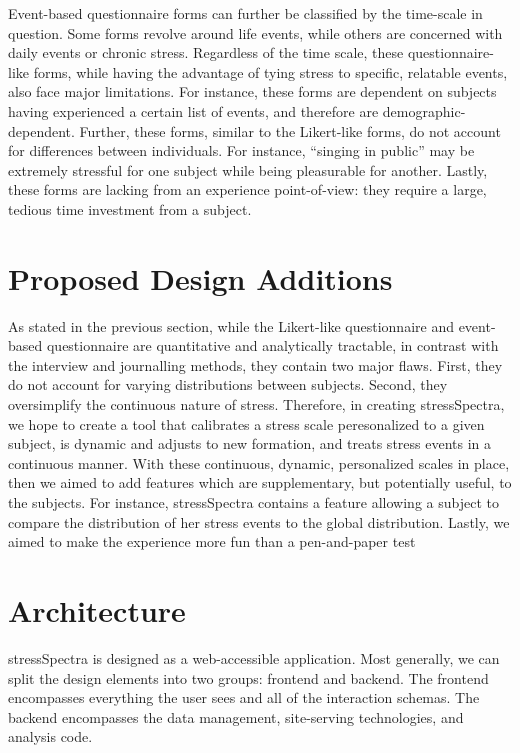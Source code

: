 \documentclass{sigchi}
\begin{document}
Event-based questionnaire forms can further be classified by the time-scale in question. Some forms revolve around life events, while others are concerned with daily events or chronic stress. Regardless of the time scale, these questionnaire-like forms, while having the advantage of tying stress to specific, relatable events, also face major limitations. For instance, these forms are dependent on subjects having experienced a certain list of events, and therefore are demographic-dependent. Further, these forms, similar to the Likert-like forms, do not account for differences between individuals. For instance, “singing in public” may be extremely stressful for one subject while being pleasurable for another. Lastly, these forms are lacking from an experience point-of-view: they require a large, tedious time investment from a subject.


\section{Proposed Design Additions}
As stated in the previous section, while the Likert-like questionnaire and event-based questionnaire are quantitative and analytically tractable, in contrast with the interview and journalling methods, they contain two major flaws. First, they do not account for varying distributions between subjects. Second, they oversimplify the continuous nature of stress.
Therefore, in creating stressSpectra, we hope to create a tool that calibrates a stress scale peresonalized to a given subject, is dynamic and adjusts to new formation, and treats stress events in a continuous manner.
With these continuous, dynamic, personalized scales in place, then we aimed to add features which are supplementary, but potentially useful, to the subjects. For instance, stressSpectra contains a feature allowing a subject to compare the distribution of her stress events to the global distribution. Lastly, we aimed to make the experience more fun than a pen-and-paper test

\section{Architecture}
stressSpectra is designed as a web-accessible application. Most generally, we can split the design elements into two groups: frontend and backend. The frontend encompasses everything the user sees and all of the interaction schemas. The backend encompasses the data management, site-serving technologies, and analysis code. 
\end{document}
